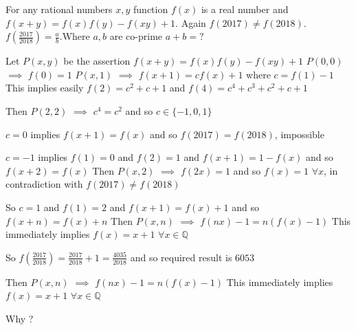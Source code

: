 \begin{solution}
	\begin{tcolorbox}For any rational numbers $x, y$ function $f(x)$ is a real number and $f(x+y)=f(x)f(y)-f(xy)+1$. Again $f(2017)\neq f(2018)$. $f(\frac{2017}{2018})=\frac{a}{b}$.Where $a,b$ are co-prime $a+b=?$\end{tcolorbox}
Let $P(x,y)$ be the assertion $f(x+y)=f(x)f(y)-f(xy)+1$
$P(0,0)$ $\implies$ $f(0)=1$
$P(x,1)$ $\implies$ $f(x+1)=cf(x)+1$ where $c=f(1)-1$
This implies easily $f(2)=c^2+c+1$ and $f(4)=c^4+c^3+c^2+c+1$

Then $P(2,2)$ $\implies$ $c^4=c^2$ and so $c\in\{-1,0,1\}$

$c=0$ implies $f(x+1)=f(x)$ and so $f(2017)=f(2018)$, impossible

$c=-1$ implies $f(1)=0$ and $f(2)=1$ and $f(x+1)=1-f(x)$ and so $f(x+2)=f(x)$
Then $P(x,2)$ $\implies$ $f(2x)=1$ and so $f(x)=1$ $\forall x$, in contradiction with $f(2017)\ne f(2018)$

So $c=1$ and $f(1)=2$ and $f(x+1)=f(x)+1$ and so $f(x+n)=f(x)+n$
Then $P(x,n)$ $\implies$ $f(nx)-1=n(f(x)-1)$
This immediately implies $f(x)=x+1$ $\forall x\in\mathbb Q$

So $f(\frac{2017}{2018})=\frac{2017}{2018}+1=\frac{4035}{2018}$ and so required result is $\boxed{6053}$



\end{solution}



\begin{solution}
	\begin{tcolorbox}
Then $P(x,n)$ $\implies$ $f(nx)-1=n(f(x)-1)$
This immediately implies $f(x)=x+1$ $\forall x\in\mathbb Q$

\end{tcolorbox}

Why ?


\end{solution}






